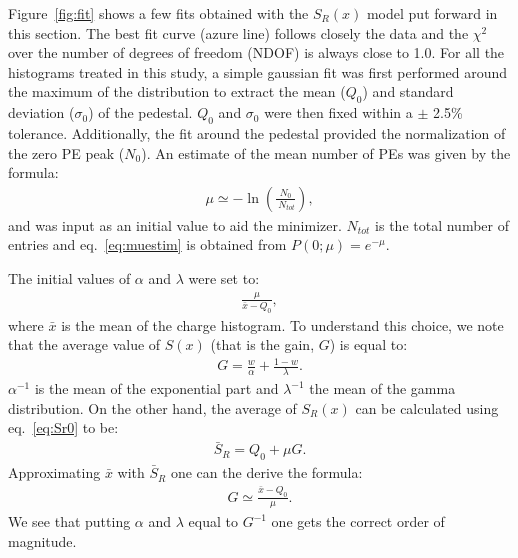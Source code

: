 \documentclass[a4paper,11pt]{article}
\begin{document}
Figure~\ref{fig:fit} shows  a few fits obtained with the $S_R(x)$ model put forward in this section. 
The best fit curve (azure line) follows closely the data and the $\chi^2$ over the number of degrees of freedom (NDOF) is always close to 1.0. 
For all the histograms treated in this study, a simple gaussian fit was first performed around the maximum of the distribution to extract the mean ($Q_0$) and standard deviation ($\sigma_0$) of the pedestal. 
$Q_0$ and $\sigma_0$ were then fixed within a $\pm$ 2.5\% tolerance. 
Additionally, the fit around the pedestal provided the normalization of the zero PE peak ($N_0$). 
An estimate of the mean number of PEs was given by the formula: 
\begin{align}
\mu \simeq - \ln \left(  \frac{N_0}{\ N_{tot}} \right),  
\label{eq:muestim}
\end{align}
and was input as an initial value to aid the minimizer. 
$N_{tot}$ is the total number of entries and eq.~\eqref{eq:muestim} is obtained from $P(0; \mu ) = e^{-\mu}$. 

The initial values of $\alpha$ and $\lambda$ were set to: 
\begin{align}
\frac{\mu}{ \bar x - Q_0 },
\label{eq:laestim}
\end{align}
where $\bar x$ is the mean of the charge histogram. 
To understand this choice, we note that the average value of $S(x)$ (that is the gain, $G$) is equal to: 
\begin{align}
G = \frac{w}{\alpha} + \frac{1-w}{\lambda}. 
\label{eq:G}
\end{align}
$\alpha^{-1}$ is the mean of the exponential part and $\lambda^{-1}$ the mean of the gamma distribution. 
On the other hand, the average of $S_R(x)$ can be calculated using eq.~\eqref{eq:Sr0} to be:
\begin{align}
\bar S_R = Q_0 + \mu G.  
\label{eq:x}
\end{align}
Approximating $\bar x$ with $\bar S_R$ one can the derive the formula: 
\begin{align}
G \simeq \frac{\bar x - Q_0}{\mu}. 
\end{align}
We see that putting $\alpha$ and $\lambda$ equal to $G^{-1}$ one gets the correct order of magnitude.  
\end{document}
